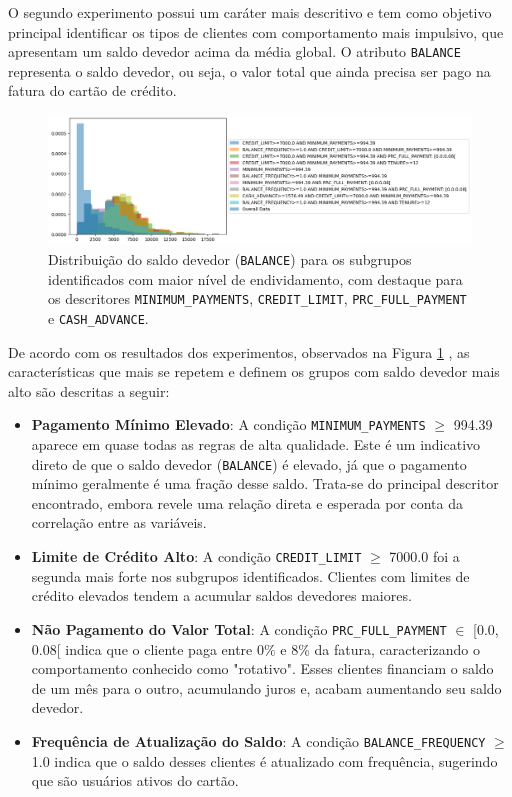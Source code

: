\documentclass[12pt]{article}
\begin{document}
\hspace{1.2cm}O segundo experimento possui um caráter mais descritivo e tem como objetivo principal identificar os tipos de clientes com comportamento mais impulsivo, que apresentam um saldo devedor acima da média global. O atributo \texttt{BALANCE} representa o saldo devedor, ou seja, o valor total que ainda precisa ser pago na fatura do cartão de crédito.

\begin{figure}[h]
    \centering
    \includegraphics[width=1\textwidth]{imagens/experimento3.png}
    \caption{Distribuição do saldo devedor (\texttt{BALANCE}) para os subgrupos identificados com maior nível de endividamento, com destaque para os descritores \texttt{MINIMUM\_PAYMENTS}, \texttt{CREDIT\_LIMIT},
    \label{fig:experimento4}\texttt{PRC\_FULL\_PAYMENT} e \texttt{CASH\_ADVANCE}.}
\end{figure}

De acordo com os resultados dos experimentos, observados na Figura \ref{fig:experimento4} , as características que mais se repetem e definem os grupos com saldo devedor mais alto são descritas a seguir:

\begin{itemize}
    \item \textbf{Pagamento Mínimo Elevado}: A condição \texttt{MINIMUM\_PAYMENTS} $\geq$ 994.39 aparece em quase todas as regras de alta qualidade. Este é um indicativo direto de que o saldo devedor (\texttt{BALANCE}) é elevado, já que o pagamento mínimo geralmente é uma fração desse saldo. Trata-se do principal descritor encontrado, embora revele uma relação direta e esperada por conta da correlação entre as variáveis.

    \item \textbf{Limite de Crédito Alto}: A condição \texttt{CREDIT\_LIMIT} $\geq$ 7000.0 foi a segunda mais forte nos subgrupos identificados. Clientes com limites de crédito elevados tendem a acumular saldos devedores maiores.

    \item \textbf{Não Pagamento do Valor Total}: A condição \texttt{PRC\_FULL\_PAYMENT} $\in$ [0.0, 0.08[ indica que o cliente paga entre 0\% e 8\% da fatura, caracterizando o comportamento conhecido como "rotativo". Esses clientes financiam o saldo de um mês para o outro, acumulando juros e, acabam aumentando seu saldo devedor.

    \item \textbf{Frequência de Atualização do Saldo}: A condição \texttt{BALANCE\_FREQUENCY} $\geq$ 1.0 indica que o saldo desses clientes é atualizado com frequência, sugerindo que são usuários ativos do cartão.
\end{itemize}
\end{document}
